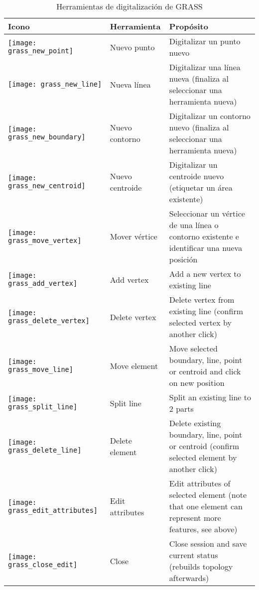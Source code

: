 \begin{table}[h]
\centering
\caption{Herramientas de digitalización de GRASS}\label{tab:grass_tools}\medskip
 \begin{tabular}{|l|l|p{5in}|}
 \hline \textbf{Icono} & \textbf{Herramienta} & \textbf{Propósito} \\
\hline \texttt{[image: grass\_new\_point]} & Nuevo punto & Digitalizar un punto nuevo \\
\hline \texttt{[image: grass\_new\_line]} & Nueva línea &  Digitalizar una línea nueva (finaliza al seleccionar una herramienta nueva) \\
\hline \texttt{[image: grass\_new\_boundary]} & Nuevo contorno & Digitalizar un contorno nuevo (finaliza al seleccionar una herramienta nueva)\\
\hline \texttt{[image: grass\_new\_centroid]} & Nuevo centroide & Digitalizar un centroide nuevo (etiquetar un área existente)\\
\hline \texttt{[image: grass\_move\_vertex]} & Mover vértice & Seleccionar un vértice de una línea o contorno existente e identificar una nueva posición\\
\hline \texttt{[image: grass\_add\_vertex]} & Add vertex & Add a
new vertex to existing line\\
\hline \texttt{[image: grass\_delete\_vertex]} & Delete vertex &
Delete vertex from existing line (confirm selected vertex by another click)\\
\hline \texttt{[image: grass\_move\_line]} & Move element & Move
selected boundary, line, point or centroid and click on new position\\
\hline \texttt{[image: grass\_split\_line]} & Split line & Split
an existing line to 2 parts\\
\hline \texttt{[image: grass\_delete\_line]} & Delete element &
Delete existing boundary, line, point or centroid (confirm selected element by
another click)\\
\hline \texttt{[image: grass\_edit\_attributes]} & Edit attributes
& Edit attributes of selected element (note that one element can represent
more features, see above)\\
\hline \texttt{[image: grass\_close\_edit]} & Close & Close
session and save current status (rebuilds topology afterwards)\\
\hline
\end{tabular}
\end{table}

